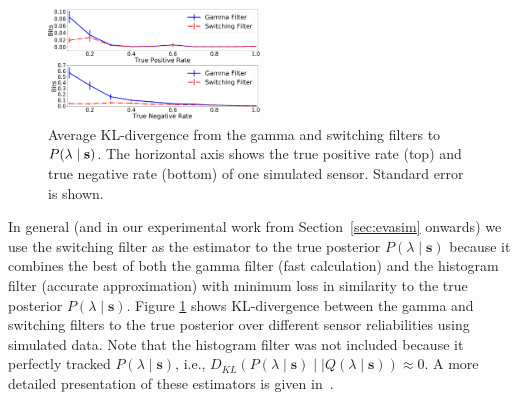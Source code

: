\begin{figure}[t!]
	\centering
	\includegraphics[width=0.5\textwidth]{./figures/kl_div_tpr_tnr_var.png}
	\caption{Average KL-divergence from the gamma and switching filters to $P(\lambda \mid \protect\mathbf{s})$. The horizontal axis shows the true positive rate (top) and true negative rate (bottom) of one simulated sensor. Standard error is shown.} 
	\label{fig:kl_div_tpr_tnr_var}
\end{figure}

In general (and in our experimental work from Section~\ref{sec:evasim} onwards) we use the switching filter as the estimator to the true posterior $P(\lambda \mid \mathbf{s})$ because it combines the best of both the gamma filter (fast calculation) and the histogram filter (accurate approximation) with minimum loss in similarity to the true posterior $P(\lambda \mid \mathbf{s})$. Figure \ref{fig:kl_div_tpr_tnr_var} shows KL-divergence between the gamma and switching filters to the true posterior over different sensor reliabilities using simulated data. Note that the histogram filter was not included because it perfectly tracked $P(\lambda \mid \mathbf{s})$, i.e., $D_{KL}(P(\lambda \mid \mathbf{s}) \mid \mid Q(\lambda \mid \mathbf{s})) \approx 0$. A more detailed presentation of these estimators is given in~\cite{jovan18a}.